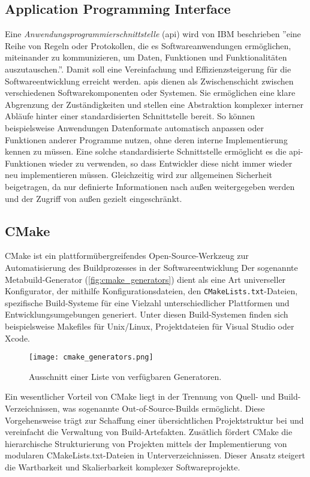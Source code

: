 \subsection{Application Programming Interface}
Eine \emph{Anwendungsprogrammierschnittstelle} (\gls{api}) wird von IBM beschrieben ''eine Reihe von Regeln oder Protokollen, die es Softwareanwendungen ermöglichen, miteinander zu kommunizieren, um Daten, Funktionen und Funktionalitäten auszutauschen.''\cite{ibmAPI}.
Damit soll eine Vereinfachung und Effizienzsteigerung für die Softwareentwicklung erreicht werden.
\glspl{api} dienen als Zwischenschicht zwischen verschiedenen Softwarekomponenten oder Systemen.
Sie ermöglichen eine klare Abgrenzung der Zuständigkeiten und stellen eine Abstraktion komplexer interner Abläufe hinter einer standardisierten Schnittstelle bereit.
So können beispielsweise Anwendungen Datenformate automatisch anpassen oder Funktionen anderer Programme nutzen, ohne deren interne Implementierung kennen zu müssen.
Eine solche standardisierte Schnittstelle ermöglicht es die \gls{api}-Funktionen wieder zu verwenden, so dass Entwickler diese nicht immer wieder neu implementieren müssen.
Gleichzeitig wird zur allgemeinen Sicherheit beigetragen, da nur definierte Informationen nach außen weitergegeben werden und der Zugriff von außen gezielt eingeschränkt.


\subsection{CMake}
CMake ist ein plattformübergreifendes Open-Source-Werkzeug zur Automatisierung des Buildprozesses in der Softwareentwicklung
Der sogenannte Metabuild-Generator (\autoref{fig:cmake_generators}) dient als eine Art universeller Konfigurator, der mithilfe Konfigurationsdateien, den \texttt{CMakeLists.txt}-Dateien, spezifische Build-Systeme für eine Vielzahl unterschiedlicher Plattformen und Entwicklungsumgebungen generiert.
Unter diesen Build-Systemen finden sich beispielsweise Makefiles für Unix/Linux, Projektdateien für Visual Studio oder Xcode.

\begin{figure}[H]
	\texttt{[image: cmake\_generators.png]}
	\caption{Ausschnitt einer Liste von verfügbaren Generatoren.}
	\label{fig:cmake_generators}
\end{figure}

Ein wesentlicher Vorteil von CMake liegt in der Trennung von Quell- und Build-Verzeichnissen, was sogenannte Out-of-Source-Builds ermöglicht.
Diese Vorgehensweise trägt zur Schaffung einer übersichtlichen Projektstruktur bei und vereinfacht die Verwaltung von Build-Artefakten.
Zusätlich fördert CMake die hierarchische Strukturierung von Projekten mittels der Implementierung von modularen CMakeLists.txt-Dateien in Unterverzeichnissen.
Dieser Ansatz steigert die Wartbarkeit und Skalierbarkeit komplexer Softwareprojekte.

